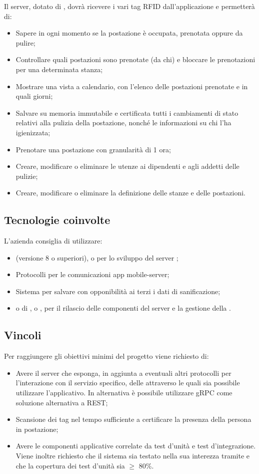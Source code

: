 Il server, dotato di , dovrà ricevere i vari tag RFID dall'applicazione e permetterà di:
\begin{itemize}
	\item Sapere in ogni momento se la postazione è occupata, prenotata oppure da pulire;
	\item Controllare quali postazioni sono prenotate (da chi) e bloccare le prenotazioni per una determinata stanza;
	\item Mostrare una vista a calendario, con l’elenco delle postazioni prenotate e in quali giorni;
	\item Salvare su memoria immutabile e certificata tutti i cambiamenti di stato relativi alla pulizia della postazione, nonch\'e le informazioni su chi l'ha igienizzata;
	\item Prenotare una postazione con granularità di 1 ora;
	\item Creare, modificare o eliminare le utenze ai dipendenti e agli addetti delle pulizie;
	\item Creare, modificare o eliminare la definizione delle stanze e delle postazioni.
\end{itemize}

\subsection{Tecnologie coinvolte}
L'azienda consiglia di utilizzare:
\begin{itemize}
\item {} (versione 8 o superiori),  o  per lo sviluppo del server ;
\item Protocolli  per le comunicazioni app mobile-server;
\item Sistema  per salvare con opponibilità ai terzi i dati di sanificazione;
\item {} o di ,  o , per il rilascio delle componenti del server e la gestione della .
\end{itemize}

\subsection{Vincoli}
Per raggiungere gli obiettivi minimi del progetto viene richiesto di:
\begin{itemize}
\item Avere il server che esponga, in aggiunta a eventuali altri protocolli per l’interazione con il servizio specifico, delle   attraverso le quali sia possibile utilizzare l'applicativo. In alternativa è possibile utilizzare gRPC come soluzione alternativa a REST;
\item Scansione dei tag nel tempo sufficiente a certificare la presenza della persona in postazione;
\item Avere le componenti applicative correlate da test d'unità e test d’integrazione. Viene inoltre richiesto che il sistema sia testato nella sua interezza tramite  e che la copertura dei test d'unità sia $\geq$ 80\%.
\end{itemize}

